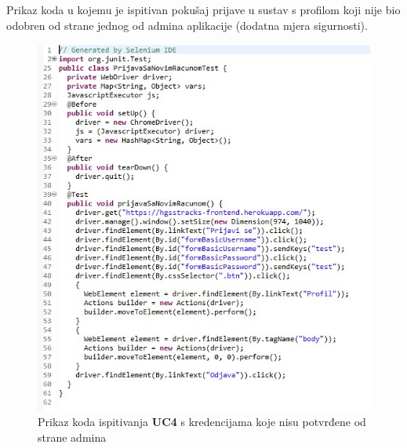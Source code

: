 			\newpage
			\begin{packed_item}
				\item {Prikaz koda u kojemu je ispitivan pokušaj prijave u sustav s profilom koji nije bio odobren od strane jednog od admina aplikacije (dodatna mjera sigurnosti).}\\
				
				\begin{figure}[h!]
					\centering
					\includegraphics[width=\linewidth]{./slike/PokusajPrijaveSaNepotvdrenimRacunom.jpg}
					\caption{Prikaz koda ispitivanja \textbf{UC4} s kredencijama koje nisu potvrđene od strane admina}
				\end{figure}
				\eject
			\end{packed_item}
		
